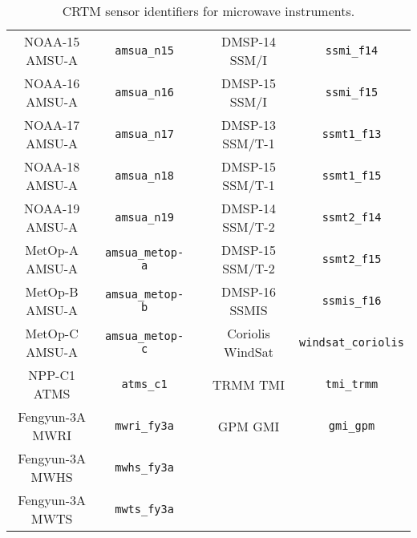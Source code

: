 \begin{table}[htp]
\begin{tabular}{c c c c c}
NOAA-15 AMSU-A  & \texttt{amsua\_n15}     & \hspace{0.2cm} & DMSP-14 SSM/I    & \texttt{ssmi\_f14}          \\
NOAA-16 AMSU-A  & \texttt{amsua\_n16}     & \hspace{0.2cm} & DMSP-15 SSM/I    & \texttt{ssmi\_f15}          \\
NOAA-17 AMSU-A  & \texttt{amsua\_n17}     & \hspace{0.2cm} & DMSP-13 SSM/T-1  & \texttt{ssmt1\_f13}         \\
NOAA-18 AMSU-A  & \texttt{amsua\_n18}     & \hspace{0.2cm} & DMSP-15 SSM/T-1  & \texttt{ssmt1\_f15}         \\
NOAA-19 AMSU-A  & \texttt{amsua\_n19}     & \hspace{0.2cm} & DMSP-14 SSM/T-2  & \texttt{ssmt2\_f14}         \\
MetOp-A AMSU-A  & \texttt{amsua\_metop-a} & \hspace{0.2cm} & DMSP-15 SSM/T-2  & \texttt{ssmt2\_f15}         \\
MetOp-B AMSU-A  & \texttt{amsua\_metop-b} & \hspace{0.2cm} & DMSP-16 SSMIS    & \texttt{ssmis\_f16}         \\
MetOp-C AMSU-A  & \texttt{amsua\_metop-c} & \hspace{0.2cm} & Coriolis WindSat & \texttt{windsat\_coriolis}  \\
NPP-C1 ATMS     & \texttt{atms\_c1}       & \hspace{0.2cm} & TRMM TMI         & \texttt{tmi\_trmm}          \\
Fengyun-3A MWRI & \texttt{mwri\_fy3a}     & \hspace{0.2cm} & GPM GMI          & \texttt{gmi\_gpm}           \\
Fengyun-3A MWHS & \texttt{mwhs\_fy3a}     & \hspace{0.2cm} &                  &                             \\
Fengyun-3A MWTS & \texttt{mwts\_fy3a}     & \hspace{0.2cm} &                  &                             \\
    \hline
  \end{tabular}
  \caption{CRTM sensor identifiers for microwave instruments.}
  \label{tab:mw_sensor_id}
\end{table}


